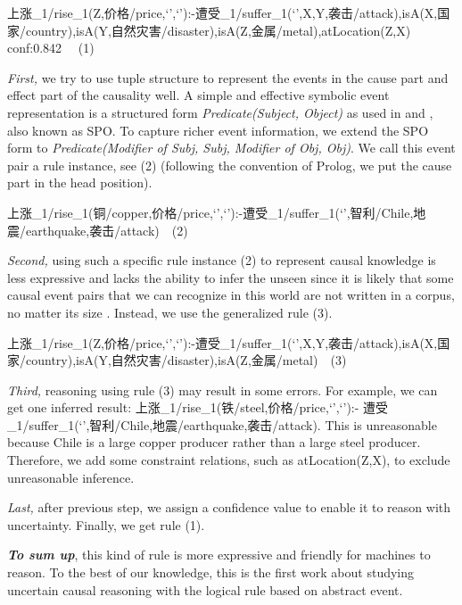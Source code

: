 上涨\_1/rise\_1(Z,价格/price,`',`'):-遭受\_1/suffer\_1(`',X,Y,袭击/attack),isA(X,国家/country),isA(Y,自然灾害/disaster),isA(Z,金属/metal),atLocation(Z,X) conf:0.842 \ \ (1)

\textit{First,} we try to use tuple structure to represent the events in the cause part and effect part of the causality well. A simple and effective symbolic event representation is a structured form \textit{Predicate(Subject, Object)} as used in \cite{Ding} and \cite{Ding2016}, also known as SPO. To capture richer event information, we extend the SPO form to \textit{Predicate(Modifier of Subj, Subj, Modifier of Obj, Obj)}. 
We call this event pair a rule instance, see (2) (following the convention of Prolog, we put the cause part in the head position).

上涨\_1/rise\_1(铜/copper,价格/price,`',`'):-遭受\_1/suffer\_1(`',智利/Chile,地震/earthquake,袭击/attack)\ \ (2)

\textit{Second,} using such a specific rule instance (2) to represent causal knowledge is less expressive and lacks the ability to infer the unseen since it is likely that some causal event pairs that we can recognize in this world are not written in a
corpus, no matter its size \cite{ha2015gener}. Instead, we use the generalized rule (3).

上涨\_1/rise\_1(Z,价格/price,`',`'):-遭受\_1/suffer\_1(`',X,Y,袭击/attack),isA(X,国家/country),isA(Y,自然灾害/disaster),isA(Z,金属/metal)\ \ (3)

\textit{Third,} reasoning using rule (3) may result in some errors. For example, we can get one inferred result: 上涨\_1/rise\_1(铁/steel,价格/price,`',`'):- 遭受\_1/suffer\_1(`',智利/Chile,地震/earthquake,袭击/attack). This is unreasonable because Chile is a large copper producer rather than a large steel producer. Therefore, we add some constraint relations, such as atLocation(Z,X), to exclude unreasonable inference.

\textit{Last,} after previous step, we assign a confidence value to enable it to reason with uncertainty. Finally, we get rule (1).

\textbf{\textit{To sum up}}, this kind of rule is more expressive and friendly for machines to reason.
To the best of our knowledge, this is the first work about studying uncertain causal reasoning with the logical rule based on abstract event. 

